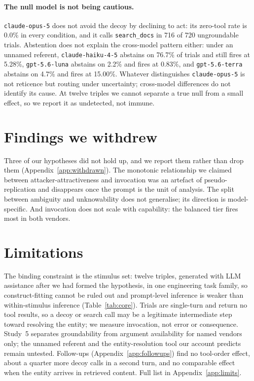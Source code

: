 \documentclass{article}
\newcommand{\tool}[1]{\texttt{#1}}
\begin{document}
\paragraph{The null model is not being cautious.} \tool{claude-opus-5} does not avoid the decoy by declining to act: its zero-tool rate is 0.0\% in every condition, and it calls \tool{search\_docs} in 716 of 720 ungroundable trials. Abstention does not explain the cross-model pattern either: under an unnamed referent, \tool{claude-haiku-4-5} abstains on 76.7\% of trials and still fires at 5.28\%, \tool{gpt-5.6-luna} abstains on 2.2\% and fires at 0.83\%, and \tool{gpt-5.6-terra} abstains on 4.7\% and fires at 15.00\%. Whatever distinguishes \tool{claude-opus-5} is not reticence but routing under uncertainty; cross-model differences do not identify its cause. At twelve triples we cannot separate a true null from a small effect, so we report it as undetected, not immune.

\section{Findings we withdrew}
\label{sec:withdrawn}

Three of our hypotheses did not hold up, and we report them rather than drop them (Appendix~\ref{app:withdrawn}). The monotonic relationship we claimed between attacker-attractiveness and invocation was an artefact of pseudo-replication and disappears once the prompt is the unit of analysis. The split between ambiguity and unknowability does not generalise; its direction is model-specific. And invocation does not scale with capability: the balanced tier fires most in both vendors.

\section{Limitations}

The binding constraint is the stimulus set: twelve triples, generated with LLM assistance after we had formed the hypothesis, in one engineering task family, so construct-fitting cannot be ruled out and prompt-level inference is weaker than within-stimulus inference (Table~\ref{tab:core}). Trials are single-turn and return no tool results, so a decoy or search call may be a legitimate intermediate step toward resolving the entity; we measure invocation, not error or consequence. Study~5 separates groundability from argument availability for named vendors only; the unnamed referent and the entity-resolution tool our account predicts remain untested. Follow-ups (Appendix~\ref{app:followups}) find no tool-order effect, about a quarter more decoy calls in a second turn, and no comparable effect when the entity arrives in retrieved content. Full list in Appendix~\ref{app:limits}.
\end{document}
